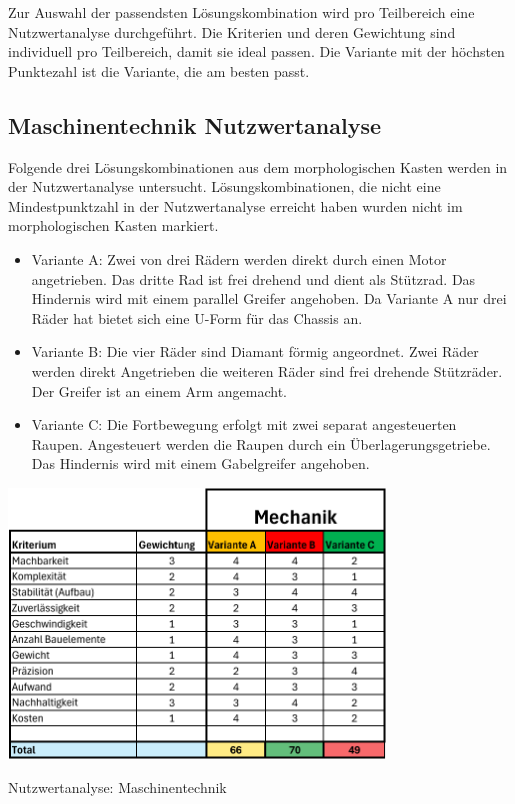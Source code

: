 Zur Auswahl der passendsten Lösungskombination wird pro Teilbereich eine Nutzwertanalyse durchgeführt. Die Kriterien und deren Gewichtung sind individuell pro Teilbereich, damit sie ideal passen. Die Variante mit der höchsten Punktezahl ist die Variante, die am besten passt.

\subsection{Maschinentechnik Nutzwertanalyse}

Folgende drei Lösungskombinationen aus dem morphologischen Kasten werden in der Nutzwertanalyse untersucht. Lösungskombinationen, die nicht eine Mindestpunktzahl in der Nutzwertanalyse erreicht haben wurden nicht im morphologischen Kasten markiert. 

\begin{itemize}
    \item Variante A: Zwei von drei Rädern werden direkt durch einen Motor angetrieben. Das dritte Rad ist frei drehend und dient als Stützrad. Das Hindernis wird mit einem parallel Greifer angehoben. Da Variante A nur drei Räder hat bietet sich eine U-Form für das Chassis an. 
    \item Variante B: Die vier Räder sind Diamant förmig angeordnet. Zwei Räder werden direkt Angetrieben die weiteren Räder sind frei drehende Stützräder. Der Greifer ist an einem Arm angemacht. 
    \item Variante C: Die Fortbewegung erfolgt mit zwei separat angesteuerten Raupen. Angesteuert werden die Raupen durch ein Überlagerungsgetriebe. Das Hindernis wird mit einem Gabelgreifer angehoben. 
\end{itemize}

\begin{table}[H]
\centering
\includegraphics[width=0.75\textwidth]{assets/Nutzwertanalyse-M.pdf}
\caption{Nutzwertanalyse: Maschinentechnik}
\label{table:nutzwert-maschinentechnik}
\end{table}


